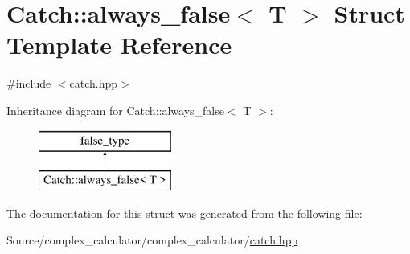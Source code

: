 \hypertarget{struct_catch_1_1always__false}{}\section{Catch\+:\+:always\+\_\+false$<$ T $>$ Struct Template Reference}
\label{struct_catch_1_1always__false}


{\ttfamily \#include $<$catch.\+hpp$>$}

Inheritance diagram for Catch\+:\+:always\+\_\+false$<$ T $>$\+:\begin{figure}[H]
\begin{center}
\leavevmode
\includegraphics[height=2.000000cm]{struct_catch_1_1always__false}
\end{center}
\end{figure}


The documentation for this struct was generated from the following file\+:\begin{DoxyCompactItemize}
\item 
Source/complex\+\_\+calculator/complex\+\_\+calculator/\mbox{\hyperlink{catch_8hpp}{catch.\+hpp}}\end{DoxyCompactItemize}
